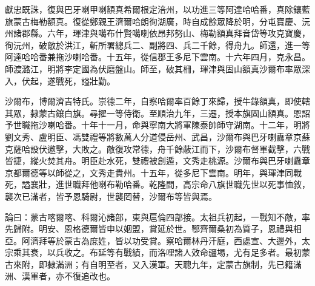 \begin{pinyinscope}
獻忠既誅，復與巴牙喇甲喇額真希爾根定涪州，以功進三等阿達哈哈番，真除鑲藍旗蒙古梅勒額真。復從鄭親王濟爾哈朗徇湖廣，時自成餘眾降於明，分屯寶慶、沅州諸郡縣。六年，琿津與噶布什賢噶喇依昂邦努山、梅勒額真拜音岱等攻克寶慶，徇沅州，破敵於洪江，斬所署總兵二、副將四、兵二千餘，得舟九。師還，進一等阿達哈哈番兼拖沙喇哈番。十五年，從信郡王多尼下雲南。十六年四月，克永昌。師渡潞江，明將李定國為伏磨盤山。師至，破其柵，琿津與固山額真沙爾布率眾深入，伏起，遂戰死，謚壯勤。

沙爾布，博爾濟吉特氏。崇德二年，自察哈爾率百餘丁來歸，授牛錄額真，即使轄其眾，隸蒙古鑲白旗。尋擢一等侍衛。至順治九年，三遷，授本旗固山額真。恩詔予世職拖沙喇哈番。十年十一月，命與寧南大將軍陳泰帥師守湖南。十二年，明將劉文秀、盧明臣、馮雙禮等將數萬人分道侵岳州、武昌，沙爾布與巴牙喇纛章京蘇克薩哈設伏邀擊，大敗之。敵復攻常德，舟千餘蔽江而下，沙爾布督軍截擊，六戰皆捷，縱火焚其舟。明臣赴水死，雙禮被創遁，文秀走桃源。沙爾布與巴牙喇纛章京都爾德等以師從之，文秀走貴州。十五年，從多尼下雲南。明年，與琿津同戰死，謚襄壯，進世職拜他喇布勒哈番。乾隆間，高宗命八旗世職先世以死事恤敘，襲次已滿者，皆予恩騎尉，世襲罔替，沙爾布等皆與焉。

論曰：蒙古喀爾喀、科爾沁諸部，東與扈倫四部接。太祖兵初起，一戰知不敵，率先歸附。明安、恩格德爾皆申以姻盟，賞延於世。鄂齊爾桑初為質子，恩禮與相亞。阿濟拜等於蒙古為庶姓，皆以功受賞。察哈爾林丹汗庭，西處宣、大邊外，太宗乘其衰，以兵收之。布延等有戰績，而洛哩諸人效命疆埸，尤有足多者。最初蒙古來附，即隸滿洲；有自明至者，又入漢軍。天聰九年，定蒙古旗制，先已籍滿洲、漢軍者，亦不復追改也。


\end{pinyinscope}